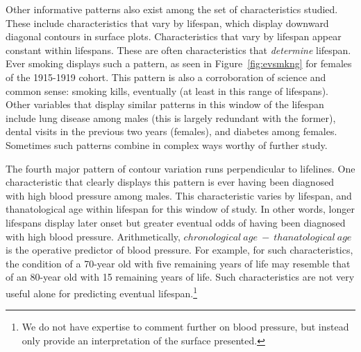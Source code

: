 \documentclass[11pt,oneside]{article} %
\begin{document}
Other informative patterns also exist among the set of characteristics studied.
These include characteristics that vary by lifespan, which display downward
diagonal contours in surface plots. Characteristics that vary by lifespan appear
constant within lifespans. These are often characteristics that \textit{determine} lifespan. Ever smoking displays such a pattern, as seen in
Figure~\ref{fig:evsmkng} for females of the 1915-1919 cohort. This pattern is
also a corroboration of science and common sense: smoking kills, eventually (at
least in this range of lifespans). Other variables that display similar patterns in this
window of the lifespan include lung disease among males (this is largely
redundant with the former), dental visits in the previous two years (females),
and diabetes among females. Sometimes such patterns combine in complex ways worthy of further study.

The fourth major pattern of contour variation runs perpendicular to lifelines.
One characteristic that clearly displays this pattern is ever having been
diagnosed with high blood pressure among males. This characteristic varies by
lifespan, and thanatological age within lifespan for this window of study.
In other words, longer lifespans display later onset but greater eventual odds of
having been diagnosed with high blood pressure. Arithmetically, $chronological~
age~-~thanatological~age$ is the operative predictor of blood pressure. For
example, for such characteristics, the condition of a 70-year old with five
remaining years of life may resemble that of an 80-year old with
15 remaining years of life. Such characteristics are not very useful alone for predicting eventual
lifespan.\footnote{We do not have expertise to comment further on blood pressure, but instead only provide an interpretation of the surface presented.} 
\end{document}
